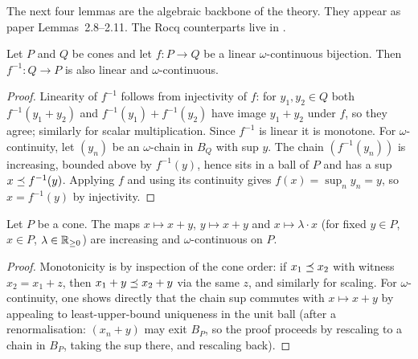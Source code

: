 The next four lemmas are the algebraic backbone of the theory. They
appear as paper Lemmas~2.8--2.11. The Rocq counterparts live in
.

\begin{lemma}
\label{lem:invf-linear-cont}
\rocqok{}
Let $P$ and $Q$ be cones and let $f : P \to Q$ be a linear
$\omega$-continuous bijection. Then $f^{-1} : Q \to P$ is also
linear and $\omega$-continuous.
\end{lemma}

\begin{proof}
Linearity of $f^{-1}$ follows from injectivity of $f$: for
$y_1, y_2 \in Q$ both $f^{-1}(y_1 + y_2)$ and $f^{-1}(y_1) +
f^{-1}(y_2)$ have image $y_1 + y_2$ under $f$, so they agree;
similarly for scalar multiplication. Since $f^{-1}$ is linear it
is monotone. For $\omega$-continuity, let $(y_n)$ be an
$\omega$-chain in $B_Q$ with sup $y$. The chain $(f^{-1}(y_n))$
is increasing, bounded above by $f^{-1}(y)$, hence sits in a
ball of $P$ and has a sup $x \preceq f^{-1}(y)$. Applying $f$ and
using its continuity gives $f(x) = \sup_n y_n = y$, so
$x = f^{-1}(y)$ by injectivity.
\end{proof}

\begin{lemma}
\label{lem:add-scale-cont}
\rocqok{}
Let $P$ be a cone. The maps
$x \mapsto x + y$, $y \mapsto x + y$ and $x \mapsto \lambda \cdot x$
(for fixed $y \in P$, $x \in P$, $\lambda \in \mathbb{R}_{\geq 0}$) are increasing
and $\omega$-continuous on $P$.
\end{lemma}

\begin{proof}
Monotonicity is by inspection of the cone order: if $x_1 \preceq x_2$
with witness $x_2 = x_1 + z$, then $x_1 + y \preceq x_2 + y$ via the
same $z$, and similarly for scaling. For $\omega$-continuity, one
shows directly that the chain sup commutes with $x \mapsto x + y$
by appealing to least-upper-bound uniqueness in the unit ball
(after a renormalisation: $(x_n + y)$ may exit $B_P$, so the proof
proceeds by rescaling to a chain in $B_P$, taking the sup there,
and rescaling back).
\end{proof}

